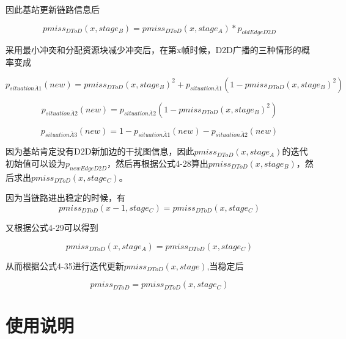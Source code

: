 \documentclass[figurelist,tablelist,algorithmlist,nomlist,masters]{seuthesix}
\begin{document}
	因此基站更新链路信息后
	
	\begin{equation}\label{eq3.2}
		pmis{s_{DToD}}(x,stag{e_B}) = pmis{s_{DToD}}(x,stag{e_A})*{p_{oldEdgeD2D}}
	\end{equation}
	
	采用最小冲突和分配资源块减少冲突后，在第x帧时候，D2D广播的三种情形的概率变成
	
	\begin{equation}\label{eq3.1}
	{p_{situation\overline A 1}}(new) = pmis{s_{DToD}}{(x,stag{e_B})^2} + {p_{situation\overline A 1}}(1 - pmis{s_{DToD}}{(x,stag{e_B})^2})
	\end{equation}
	
	\begin{equation}\label{eq3.1}
	{p_{situation\overline A 2}}(new) = {p_{situation\overline A 2}}(1 - pmis{s_{DToD}}{(x,stag{e_B})^2})
	\end{equation}
	
	\begin{equation}\label{eq3.1}
	{p_{situation\overline A 3}}(new) = 1 - {p_{situation\overline A 1}}(new) - {p_{situation\overline A 2}}(new)
	\end{equation}
	
	因为基站肯定没有D2D新加边的干扰图信息，因此$pmis{s_{DToD}}(x,stag{e_A})$的迭代初始值可以设为${p_{newEdgeD2D}}$，然后再根据公式4-28算出$pmis{s_{DToD}}(x,stag{e_B})$，然后求出$pmis{s_{DToD}}(x,stag{e_C})$。
	
	因为当链路进出稳定的时候，有
	\begin{equation}\label{eq3.1}
	pmis{s_{DToD}}(x - 1,stag{e_C}) = pmis{s_{DToD}}(x,stag{e_C})
	\end{equation}
	
	又根据公式4-29可以得到
	
	\begin{equation}\label{eq3.1}
	pmis{s_{DToD}}(x,stag{e_A}) = pmis{s_{DToD}}(x,stag{e_C})
	\end{equation}
	
	从而根据公式4-35进行迭代更新$pmis{s_{DToD}}(x,stage)$,当稳定后
	
	\begin{equation}\label{eq3.1}
	pmis{s_{DToD}} = pmis{s_{DToD}}(x,stag{e_C})
	\end{equation}
	
	
	
	\chapter{使用说明}
	
\end{document}
